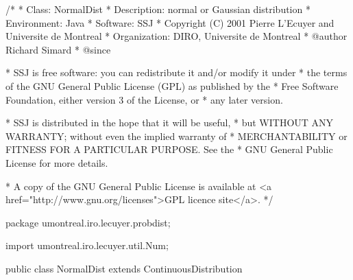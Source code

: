 \begin{code}
\begin{hide}
/*
 * Class:        NormalDist
 * Description:  normal or Gaussian distribution
 * Environment:  Java
 * Software:     SSJ 
 * Copyright (C) 2001  Pierre L'Ecuyer and Universite de Montreal
 * Organization: DIRO, Universite de Montreal
 * @author       Richard Simard
 * @since

 * SSJ is free software: you can redistribute it and/or modify it under
 * the terms of the GNU General Public License (GPL) as published by the
 * Free Software Foundation, either version 3 of the License, or
 * any later version.

 * SSJ is distributed in the hope that it will be useful,
 * but WITHOUT ANY WARRANTY; without even the implied warranty of
 * MERCHANTABILITY or FITNESS FOR A PARTICULAR PURPOSE.  See the
 * GNU General Public License for more details.

 * A copy of the GNU General Public License is available at
   <a href="http://www.gnu.org/licenses">GPL licence site</a>.
 */
\end{hide}
package umontreal.iro.lecuyer.probdist;\begin{hide}
import umontreal.iro.lecuyer.util.Num;\end{hide}

public class NormalDist extends ContinuousDistribution\begin{hide} {
   protected double mu;
   protected double sigma;
   protected static final double RAC2PI = 2.50662827463100050; // Sqrt(2*Pi)

   private static final double[]  AbarF = {
         6.10143081923200418E-1,
         -4.34841272712577472E-1,
         1.76351193643605501E-1,
         -6.07107956092494149E-2,
         1.77120689956941145E-2,
         -4.32111938556729382E-3,
         8.54216676887098679E-4,
         -1.27155090609162743E-4,
         1.12481672436711895E-5,
         3.13063885421820973E-7,
         -2.70988068537762022E-7,
         3.07376227014076884E-8,
         2.51562038481762294E-9,
         -1.02892992132031913E-9,
         2.99440521199499394E-11,
         2.60517896872669363E-11,
         -2.63483992417196939E-12,
         -6.43404509890636443E-13,
         1.12457401801663447E-13,
         1.7281533389986098E-14,
         -4.2641016949424E-15,
         -5.4537197788E-16,
         1.5869760776E-16,
         2.08998378E-17,
         -0.5900E-17
      };

\end{hide}
\end{code}
